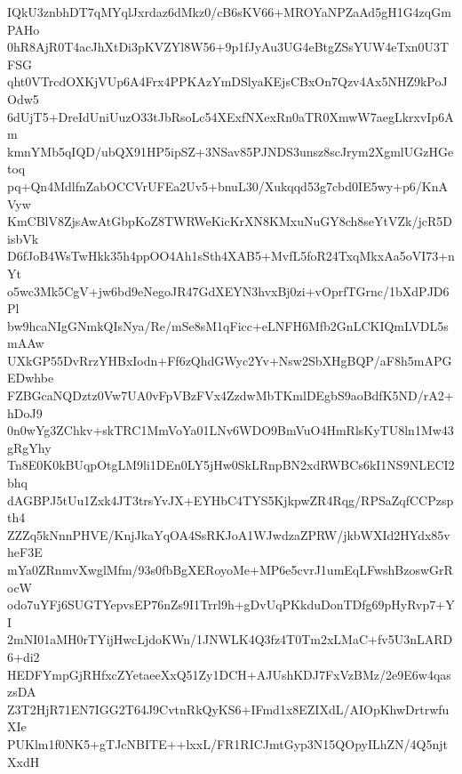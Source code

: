 IQkU3znbhDT7qMYqlJxrdaz6dMkz0/cB6sKV66+MROYaNPZaAd5gH1G4zqGmPAHo
0hR8AjR0T4acJhXtDi3pKVZYl8W56+9p1fJyAu3UG4eBtgZSsYUW4eTxn0U3TFSG
qht0VTrcdOXKjVUp6A4Frx4PPKAzYmDSlyaKEjsCBxOn7Qzv4Ax5NHZ9kPoJOdw5
6dUjT5+DreIdUniUuzO33tJbRsoLc54XExfNXexRn0aTR0XmwW7aegLkrxvIp6Am
kmnYMb5qIQD/ubQX91HP5ipSZ+3NSav85PJNDS3unsz8scJrym2XgmlUGzHGetoq
pq+Qn4MdlfnZabOCCVrUFEa2Uv5+bnuL30/Xukqqd53g7cbd0IE5wy+p6/KnAVyw
KmCBlV8ZjsAwAtGbpKoZ8TWRWeKicKrXN8KMxuNuGY8ch8seYtVZk/jcR5DisbVk
D6fJoB4WsTwHkk35h4ppOO4Ah1sSth4XAB5+MvfL5foR24TxqMkxAa5oVI73+nYt
o5wc3Mk5CgV+jw6bd9eNegoJR47GdXEYN3hvxBj0zi+vOprfTGrnc/1bXdPJD6Pl
bw9hcaNIgGNmkQIsNya/Re/mSe8sM1qFicc+eLNFH6Mfb2GnLCKIQmLVDL5smAAw
UXkGP55DvRrzYHBxIodn+Ff6zQhdGWyc2Yv+Nsw2SbXHgBQP/aF8h5mAPGEDwhbe
FZBGcaNQDztz0Vw7UA0vFpVBzFVx4ZzdwMbTKmlDEgbS9aoBdfK5ND/rA2+hDoJ9
0n0wYg3ZChkv+skTRC1MmVoYa01LNv6WDO9BmVuO4HmRlsKyTU8ln1Mw43gRgYhy
Tn8E0K0kBUqpOtgLM9li1DEn0LY5jHw0SkLRnpBN2xdRWBCs6kI1NS9NLECI2bhq
dAGBPJ5tUu1Zxk4JT3trsYvJX+EYHbC4TYS5KjkpwZR4Rqg/RPSaZqfCCPzspth4
ZZZq5kNnnPHVE/KnjJkaYqOA4SsRKJoA1WJwdzaZPRW/jkbWXId2HYdx85vheF3E
mYa0ZRnmvXwglMfm/93s0fbBgXERoyoMe+MP6e5cvrJ1umEqLFwshBzoswGrRocW
odo7uYFj6SUGTYepvsEP76nZs9I1Trrl9h+gDvUqPKkduDonTDfg69pHyRvp7+YI
2mNI01aMH0rTYijHwcLjdoKWn/1JNWLK4Q3fz4T0Tm2xLMaC+fv5U3nLARD6+di2
HEDFYmpGjRHfxcZYetaeeXxQ51Zy1DCH+AJUshKDJ7FxVzBMz/2e9E6w4qaszsDA
Z3T2HjR71EN7IGG2T64J9CvtnRkQyKS6+IFmd1x8EZIXdL/AIOpKhwDrtrwfuXIe
PUKlm1f0NK5+gTJcNBITE++lxxL/FR1RICJmtGyp3N15QOpyILhZN/4Q5njtXxdH
